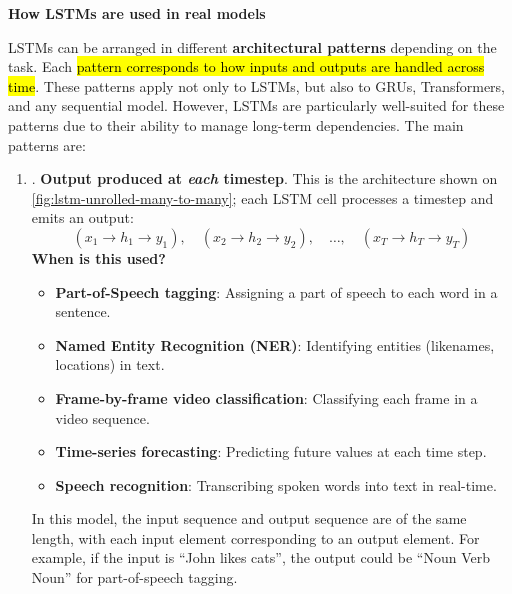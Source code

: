 \highspace
\begin{flushleft}
    \textcolor{Green3}{ \textbf{How LSTMs are used in real models}}
\end{flushleft}
LSTMs can be arranged in different \textbf{architectural patterns} depending on the task. Each \hl{pattern corresponds to how inputs and outputs are handled across time}. These patterns apply not only to LSTMs, but also to GRUs, Transformers, and any sequential model. However, LSTMs are particularly well-suited for these patterns due to their ability to manage long-term dependencies. The main patterns are:
\begin{enumerate}
    \item {}. \textbf{Output produced at \emph{each} timestep}. This is the architecture shown on \autoref{fig:lstm-unrolled-many-to-many}; each LSTM cell processes a timestep and emits an output:
    \begin{equation*}
        \left(x_{1} \to h_{1} \to y_{1}\right), \quad \left(x_{2} \to h_{2} \to y_{2}\right), \quad \ldots, \quad \left(x_{T} \to h_{T} \to y_{T}\right)
    \end{equation*}
    \textcolor{Green3}{ \textbf{When is this used?}}
    \begin{itemize}
        \item \textbf{Part-of-Speech tagging}: Assigning a part of speech to each word in a sentence.
        \item \textbf{Named Entity Recognition (NER)}: Identifying entities (like\break names, locations) in text.
        \item \textbf{Frame-by-frame video classification}: Classifying each frame in a video sequence.
        \item \textbf{Time-series forecasting}: Predicting future values at each time step.
        \item \textbf{Speech recognition}: Transcribing spoken words into text in real-time.
    \end{itemize}
    In this model, the input sequence and output sequence are of the same length, with each input element corresponding to an output element. For example, if the input is ``John likes cats'', the output could be ``Noun Verb Noun'' for part-of-speech tagging.



\end{enumerate}
